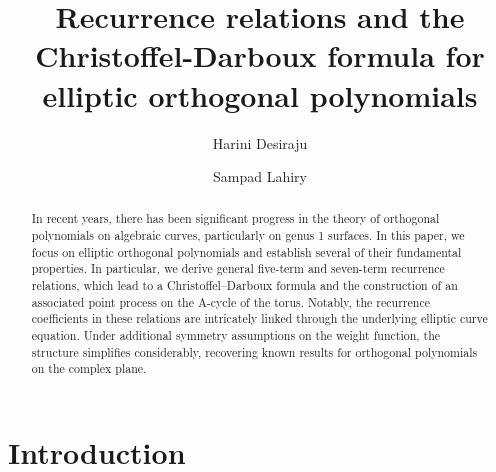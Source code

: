\documentclass[11pt,a4paper]{article}
\date{}                     %
\theoremstyle{definition}
\numberwithin{equation}{section}
\numberwithin{theorem}{section}
\begin{document}
\title{Recurrence relations and the Christoffel-Darboux formula for elliptic orthogonal polynomials}






\author[1]{Harini Desiraju}
\author[2,3]{Sampad Lahiry}
\maketitle


\begin{abstract}
In recent years, there has been significant progress in the theory of orthogonal polynomials on algebraic curves, particularly on genus 1 surfaces. In this paper, we focus on elliptic orthogonal polynomials and establish several of their fundamental properties. In particular, we derive general five-term and seven-term recurrence relations, which lead to a Christoffel–Darboux formula and the construction of an associated point process on the A-cycle of the torus. Notably, the recurrence coefficients in these relations are intricately linked through the underlying elliptic curve equation. Under additional symmetry assumptions on the weight function, the structure simplifies considerably, recovering known results for orthogonal polynomials on the complex plane.

\end{abstract}






\tableofcontents

\newpage
\section{Introduction}
\end{document}
